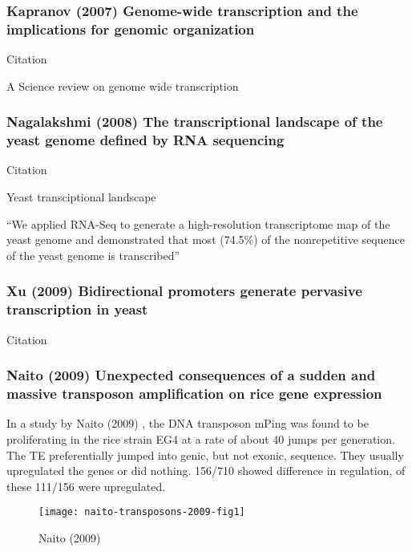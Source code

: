     \subsubsection{Kapranov (2007) Genome-wide transcription and the
    implications for genomic organization}

      Citation \cite{kapranov_genome-wide_2007}

      A Science review on genome wide transcription 

    \subsubsection{Nagalakshmi (2008) The transcriptional landscape of the
    yeast genome defined by RNA sequencing}

      Citation \cite{nagalakshmi_transcriptional_2008}

      Yeast transciptional landscape 

      ``We applied RNA-Seq to generate a high-resolution transcriptome
      map of the yeast genome and demonstrated that most (74.5\%) of the
      nonrepetitive sequence of the yeast genome is transcribed''

    \subsubsection{Xu (2009) Bidirectional promoters generate pervasive
    transcription in yeast}
    
      Citation \cite{xu_bidirectional_2009}

    \subsubsection{Naito (2009) Unexpected consequences of a sudden and
    massive transposon amplification on rice gene expression}

      In a study by Naito (2009) \cite{naito_unexpected_2009}, the DNA
      transposon mPing was found to be proliferating in the rice strain EG4
      at a rate of about 40 jumps per generation. The TE preferentially
      jumped into genic, but not exonic, sequence. They usually upregulated
      the genes or did nothing. 156/710 showed difference in regulation, of
      these 111/156 were upregulated. 

      \begin{figure}[!hbpt]
        \centering
        \texttt{[image: naito-transposons-2009-fig1]}
        \caption{Naito (2009) \cite{naito_unexpected_2009}}
      \end{figure}

